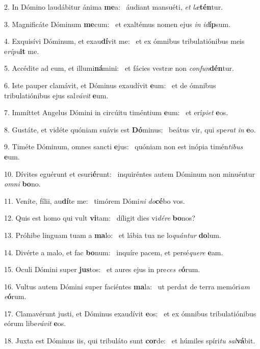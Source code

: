 2. In Dómino laudábitur ánima \textbf{me}a: \ast\  áudiant mansuéti, \textit{et} \textit{læ}\textbf{tén}tur.\

3. Magnificáte Dóminum \textbf{me}cum: \ast\  et exaltémus nomen ejus \textit{in} \textit{id}\textbf{íp}sum.\

4. Exquisívi Dóminum, et exau\textbf{dí}vit me: \ast\  et ex ómnibus tribulatiónibus meis e\textit{rí}\textit{pu}\textbf{it} me.\

5. Accédite ad eum, et illumi\textbf{ná}mini: \ast\  et fácies vestræ non \textit{con}\textit{fun}\textbf{dén}tur.\

6. Iste pauper clamávit, et Dóminus exaudívit \textbf{e}um: \ast\  et de ómnibus tribulatiónibus ejus sal\textit{vá}\textit{vit} \textbf{e}um.\

7. Immíttet Angelus Dómini in circúitu timéntium \textbf{e}um: \ast\  et erí\textit{pi}\textit{et} \textbf{e}os.\

8. Gustáte, et vidéte quóniam suávis est \textbf{Dó}minus: \ast\  beátus vir, qui spe\textit{rat} \textit{in} \textbf{e}o.\

9. Timéte Dóminum, omnes sancti \textbf{e}jus: \ast\  quóniam non est inópia timén\textit{ti}\textit{bus} \textbf{e}um.\

10. Dívites eguérunt et esuri\textbf{é}runt: \ast\  inquiréntes autem Dóminum non minuéntur \textit{om}\textit{ni} \textbf{bo}no.\

11. Veníte, fílii, au\textbf{dí}te me: \ast\  timórem Dómi\textit{ni} \textit{do}\textbf{cé}bo vos.\

12. Quis est homo qui vult \textbf{vi}tam: \ast\  díligit dies vi\textit{dé}\textit{re} \textbf{bo}nos?\

13. Próhibe linguam tuam a \textbf{ma}lo: \ast\  et lábia tua ne lo\textit{quán}\textit{tur} \textbf{do}lum.\

14. Divérte a malo, et fac \textbf{bo}num: \ast\  inquíre pacem, et persé\textit{que}\textit{re} \textbf{e}am.\

15. Oculi Dómini super \textbf{jus}tos: \ast\  et aures ejus in pre\textit{ces} \textit{e}\textbf{ó}rum.\

16. Vultus autem Dómini super faciéntes \textbf{ma}la: \ast\  ut perdat de terra memóri\textit{am} \textit{e}\textbf{ó}rum.\

17. Clamavérunt justi, et Dóminus exaudívit \textbf{e}os: \ast\  et ex ómnibus tribulatiónibus eórum libe\textit{rá}\textit{vit} \textbf{e}os.\

18. Juxta est Dóminus iis, qui tribuláto sunt \textbf{cor}de: \ast\  et húmiles spíri\textit{tu} \textit{sal}\textbf{vá}bit.\

